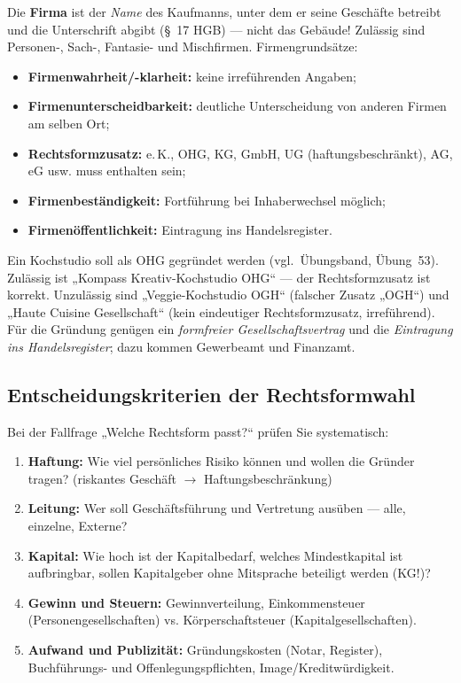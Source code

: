 \documentclass[11pt, a4paper]{article}
\begin{document}
Die \textbf{Firma} ist der \emph{Name} des Kaufmanns, unter dem er seine Geschäfte
betreibt und die Unterschrift abgibt (§~17 HGB) --- nicht das Gebäude! Zulässig sind
Personen-, Sach-, Fantasie- und Mischfirmen. Firmengrundsätze:

\begin{itemize}
  \item \textbf{Firmenwahrheit/-klarheit:} keine irreführenden Angaben;
  \item \textbf{Firmenunterscheidbarkeit:} deutliche Unterscheidung von anderen Firmen
    am selben Ort;
  \item \textbf{Rechtsformzusatz:} e.\,K., OHG, KG, GmbH, UG (haftungsbeschränkt), AG,
    eG usw. muss enthalten sein;
  \item \textbf{Firmenbeständigkeit:} Fortführung bei Inhaberwechsel möglich;
  \item \textbf{Firmenöffentlichkeit:} Eintragung ins Handelsregister.
\end{itemize}

\begin{beispiel}
Ein Kochstudio soll als OHG gegründet werden (vgl.\ Übungsband, Übung~53). Zulässig ist
„Kompass Kreativ-Kochstudio OHG`` --- der Rechtsformzusatz ist korrekt. Unzulässig sind
„Veggie-Kochstudio OGH`` (falscher Zusatz „OGH``) und „Haute Cuisine Gesellschaft``
(kein eindeutiger Rechtsformzusatz, irreführend). Für die Gründung genügen ein
\emph{formfreier Gesellschaftsvertrag} und die \emph{Eintragung ins Handelsregister};
dazu kommen Gewerbeamt und Finanzamt.
\end{beispiel}

\subsection{Entscheidungskriterien der Rechtsformwahl}

Bei der Fallfrage „Welche Rechtsform passt?`` prüfen Sie systematisch:

\begin{enumerate}
  \item \textbf{Haftung:} Wie viel persönliches Risiko können und wollen die Gründer
    tragen? (riskantes Geschäft $\rightarrow$ Haftungsbeschränkung)
  \item \textbf{Leitung:} Wer soll Geschäftsführung und Vertretung ausüben --- alle,
    einzelne, Externe?
  \item \textbf{Kapital:} Wie hoch ist der Kapitalbedarf, welches Mindestkapital ist
    aufbringbar, sollen Kapitalgeber ohne Mitsprache beteiligt werden (KG!)?
  \item \textbf{Gewinn und Steuern:} Gewinnverteilung, Einkommensteuer
    (Personengesellschaften) vs. Körperschaftsteuer (Kapitalgesellschaften).
  \item \textbf{Aufwand und Publizität:} Gründungskosten (Notar, Register),
    Buchführungs- und Offenlegungspflichten, Image/Kreditwürdigkeit.
\end{enumerate}
\end{document}
